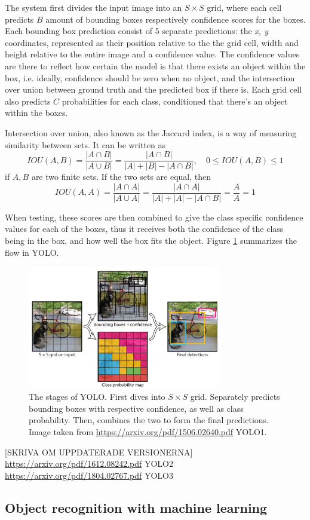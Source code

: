  The system first divides the input image into an  $S \times S$  grid, where each cell predicts $B$ amount of bounding boxes respectively confidence scores for the boxes. Each bounding box prediction consist of 5 separate predictions: the \textit{x, y} coordinates, represented as their position relative to the the grid cell, width and height relative to the entire image and a confidence value. The confidence values are there to reflect how certain the model is that there exists an object within the box, i.e. ideally, confidence should be zero when no object, and the intersection over union between ground truth and the predicted box if there is. Each grid cell also predicts $C$ probabilities for each class, conditioned that there's an object within the boxes. 
 
 Intersection over union, also known as the Jaccard index, is a way of measuring similarity between sets. It can be written as 
 \[
IOU(A,B) =  \frac{|A\cap B |}{|A\cup B|} =\frac{|A\cap B|}{|A| + |B| - |A \cap B|}
, \quad 0\leq IOU(A,B) \leq 1
 \]
 if $A,B$ are two finite sets. If the two sets are equal, then \[ IOU(A,A) =  \frac{|A\cap A |}{|A\cup A|} = \frac{|A\cap A|}{|A| + |A| - |A \cap B|}  = \frac{A}{A} = 1 \]
 
 When testing, these scores are then combined to give the class specific confidence values for each of the boxes, thus it receives both the confidence of the class being in the box, and how well the box fits the object. Figure \ref{fig:YOLO_stages} summarizes the flow in YOLO. 
\begin{figure}[hbtp]
\begin{center}
\includegraphics[width = 0.75\textwidth]{./Images/YOLO_stages.PNG} 
\caption{The stages of YOLO. First dives into $S \times S$ grid. Separately predicts bounding boxes with respective confidence, as well as class probability. Then, combines the two to form the final predictions. Image taken from \url{https://arxiv.org/pdf/1506.02640.pdf} YOLO1.}
\label{fig:YOLO_stages}
\end{center}
\end{figure}
[SKRIVA OM UPPDATERADE VERSIONERNA]
\url{https://arxiv.org/pdf/1612.08242.pdf} YOLO2
\url{https://arxiv.org/pdf/1804.02767.pdf} YOLO3
\subsection{Object recognition with machine learning}


\newpage
